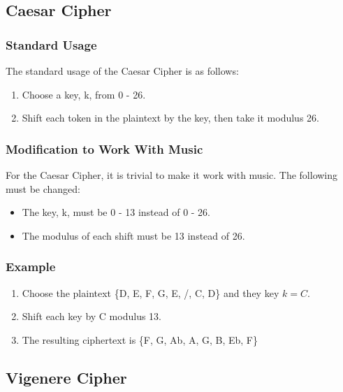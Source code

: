 \documentclass[14pt]{article}
\begin{document}
        \subsection{Caesar Cipher}
            \subsubsection{Standard Usage}
            The standard usage of the Caesar Cipher is as follows:
            \begin{enumerate}
                \item Choose a key, k, from 0 - 26.
                \item Shift each token in the plaintext by the key, then take it modulus 26.
            \end{enumerate}
            \cite{Trappe}
            
            \subsubsection{Modification to Work With Music}
            For the Caesar Cipher, it is trivial to make it work with music. The following must be changed:
            \begin{itemize}
                \item The key, k, must be 0 - 13 instead of 0 - 26.
                \item The modulus of each shift must be 13 instead of 26.
            \end{itemize}

            \subsubsection{Example}
            \begin{enumerate}
                \item Choose the plaintext \{D, E, F, G, E, /, C, D\} and they key $k = C$.
                \item Shift each key by C modulus 13.
                \item The resulting ciphertext is \{F, G, Ab, A, G, B, Eb, F\}
            \end{enumerate}
    
        \subsection{Vigenere Cipher}
\end{document}
